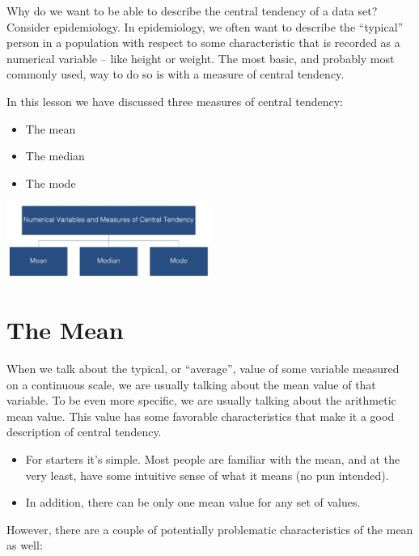 \documentclass[
  letterpaper,
  DIV=11,
  numbers=noendperiod]{scrreprt}
\providecommand{\tightlist}{%
  \setlength{\itemsep}{0pt}\setlength{\parskip}{0pt}}\usepackage{longtable,booktabs,array}
\begin{document}
Why do we want to be able to describe the central tendency of a data
set? Consider epidemiology. In epidemiology, we often want to describe
the ``typical'' person in a population with respect to some
characteristic that is recorded as a numerical variable -- like height
or weight. The most basic, and probably most commonly used, way to do so
is with a measure of central tendency.

In this lesson we have discussed three measures of central tendency:

\begin{itemize}
\tightlist
\item
  The mean
\item
  The median
\item
  The mode
\end{itemize}

\includegraphics[width=0.5\textwidth,height=\textheight]{./images/Daily-4-Pic-2.jpg}

\section*{The Mean}\label{the-mean}


When we talk about the typical, or ``average'', value of some variable
measured on a continuous scale, we are usually talking about the mean
value of that variable. To be even more specific, we are usually talking
about the arithmetic mean value. This value has some favorable
characteristics that make it a good description of central tendency.

\begin{itemize}
\item
  For starters it's simple. Most people are familiar with the mean, and
  at the very least, have some intuitive sense of what it means (no pun
  intended).
\item
  In addition, there can be only one mean value for any set of values.
\end{itemize}

However, there are a couple of potentially problematic characteristics
of the mean as well:
\end{document}
